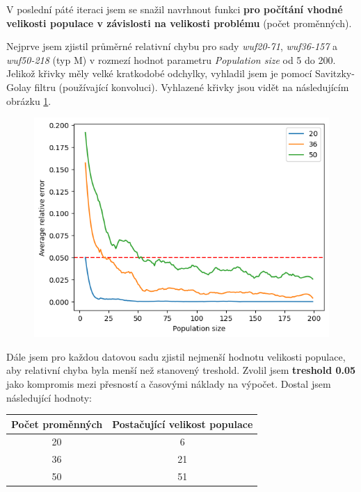 \documentclass[12pt]{article}
\begin{document}
V poslední páté iteraci jsem se snažil navrhnout funkci \textbf{pro počítání vhodné velikosti populace v závislosti na velikosti problému} (počet proměnných).

Nejprve jsem zjistil průměrné relativní chybu pro sady \textit{wuf20-71}, \textit{wuf36-157} a \textit{wuf50-218} (typ M) v rozmezí hodnot parametru \textit{Population size} od 5 do 200. Jelikož křivky měly velké kratkodobé odchylky, vyhladil jsem je pomocí Savitzky-Golay filtru (používající konvoluci). Vyhlazené křivky jsou vidět na následujícím obrázku \ref{fig:optimal_population_size_smoothed}.

\begin{figure}[H]
    \centering
    \begin{minipage}[b]{0.5\textwidth}
        \centering
        \includegraphics[width=\textwidth]{images/opt_population_size_smooth.png}
        \label{fig:optimal_population_size_smoothed}
    \end{minipage}%
\end{figure}

Dále jsem pro každou datovou sadu zjistil nejmenší hodnotu velikosti populace, aby relativní chyba byla menší než stanovený treshold. Zvolil jsem \textbf{treshold 0.05} jako kompromis mezi přesností a časovými náklady na výpočet.
Dostal jsem následující hodnoty:
\begin{table}[h!]
\centering
\begin{tabular}{|c|c|}
\hline
\textbf{Počet proměnných} & \textbf{Postačující velikost populace} \\ \hline
20                         & 6                          \\
36                         & 21                          \\
50                         & 51                          \\\hline
\end{tabular}
\end{table}
\end{document}
